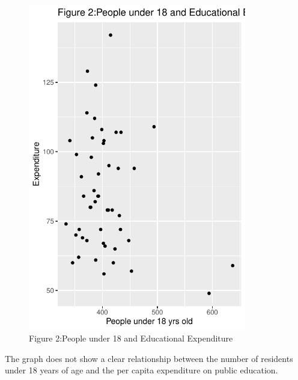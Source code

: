 \documentclass[12pt,letterpaper]{article}
\begin{document}
\begin{itemize}
		  
		\vspace{.5cm}
		\begin{figure}\centering
			\caption{Figure 2:People under 18 and Educational Expenditure}
			\includegraphics[width=0.85\textwidth]{Rplot2.pdf}
		\end{figure}
		The graph does not show a clear relationship between the number of residents under 18 years of age and the per capita expenditure on public education.
		\vspace{.5cm}
		

\end{itemize}
\end{document}
